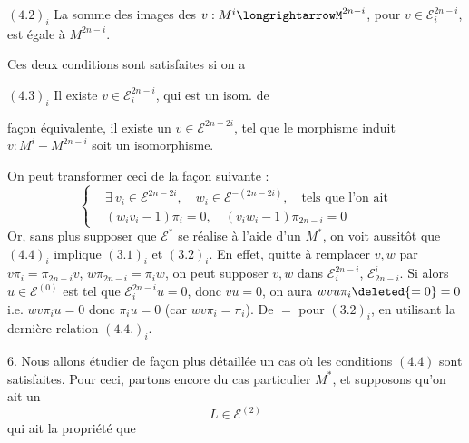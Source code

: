 $(4.2)_i$ La somme des images des $v:M^i\longrightarrowM^{2n-i}$, pour $v\in\mathcal E_i^{2n-i}$, est  égale à $M^{2n-i}$.

Ces deux conditions sont satisfaites si on a

$(4.3)_i$ Il existe  $v\in\mathcal E_i^{2n-i}$, qui est un isom. de

façon équivalente, il existe un $v\in\mathcal E^{2n-2i}$, tel que le morphisme induit $v:M^i-M^{2n-i}$ soit un isomorphisme.

On peut transformer ceci de la façon suivante :
\[
\left\{\begin{aligned}
&\exists\ v_i\in\mathcal E^{2n-2i},\quad w_i\in\mathcal E^{-(2n-2i)},\quad\text{tels que l'on ait}\\
&(w_iv_i-1)\pi_i=0,\quad(v_iw_i-1)\pi_{2n-i}=0
\end{aligned}\right.
\tag*{$(4.4)_i$}
\]
Or, sans plus supposer que $\mathcal E^*$ se réalise à l'aide d'un $M^*$, on voit aussitôt que $(4.4)_i$ implique $(3.1)_i$ et $(3.2)_i$. En effet, quitte à remplacer $v,w$ par $v\pi_i=\pi_{2n-i}v$, $w\pi_{2n-i}=\pi_iw$, on peut supposer $v,w$ dans $\mathcal E_i^{2n-i}$, $\mathcal E_{2n-i}^i$. Si alors  $u\in\mathcal E^{(0)}$ est tel que $\mathcal E_i^{2n-i}u=0$, donc $vu=0$, on aura $wvu\pi_i\deleted{=0}=0$ i.e. $wv\pi_i u=0$ donc $\pi_i u=0$ (car $wv\pi_i=\pi_i$). De $=$ pour $(3.2)_i$, en utilisant la dernière relation $(4.4.)_i$.


6. Nous allons étudier de façon plus détaillée un cas où les conditions $(4.4)$ sont satisfaites. Pour ceci, partons encore du cas particulier $M^*$,  et supposons qu'on ait un
\[
L\in\mathcal E^{(2)}
\tag{6.0}
\]
qui ait la propriété que

